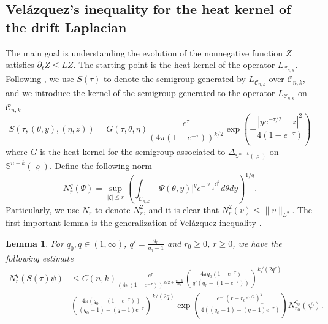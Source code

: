 \documentclass[11pt]{amsart}
\numberwithin{equation}{section}
\newtheorem{lemma}[theorem]{Lemma}
\numberwithin{equation}{section}
\newcommand{\bS}{\mathbb{S}}
\newcommand{\cC}{\mathcal{C}}
\newcommand{\pr}{\partial}
\begin{document}
	\subsection{Vel\'azquez's inequality for the heat kernel of the drift Laplacian}\label{SKZ}
	
	
	The main goal is understanding the evolution of the nonnegative function $Z$ satisfies $\pr_t Z\leq LZ$. The starting point is the heat kernel of the operator $L_{\cC_{n,k}}$. Following \cite{V1}, we use $S(\tau)$ to denote the semigroup generated by $L_{\cC_{n,k}}$ over $\cC_{n,k}$, and we introduce the kernel of the semigroup generated to the operator $L_{\cC_{n,k}}$ on $\cC_{n,k}$
	\begin{equation}\label{EqS}
		S(\tau,(\theta,y),(\eta,z))
		=G(\tau,\theta,\eta)\frac{e^\tau}{(4\pi(1-e^{-\tau}))^{k/2}}
		\exp\left(-\frac{|ye^{-\tau/2}-z|^2}{4(1-e^{-\tau})}\right)
	\end{equation}
	where $G$ is the heat kernel for the semigroup associated to $\Delta_{\bS^{n-k}(\varrho)}$ on $\bS^{n-k}(\varrho)$. Define the following norm
	\begin{equation}
		N_r^q(\Psi)=\sup_{|\xi|\leq r}\left(\int_{\cC_{n,k}}
		|\Psi(\theta,y)|^qe^{-\frac{|y-\xi|^2}{4}}d\theta dy
		\right)^{1/q}.
	\end{equation}
	Particularly, we use $N_r$ to denote $N^2_r$, and it is clear that $N^2_r(v)\leq \|v\|_{L^2}$. The first important lemma is the generalization of Vel\'azquez inequality \cite{V1}.
	
	\begin{lemma}\label{lem:estNr}
		For $q_0,q\in (1,\infty)$, $q'=\frac{q_0}{q_0-1}$ and $r_0\geq 0$, $r\geq 0$, we have the following estimate
		\begin{equation}\label{eq:estNr}
			\begin{aligned}
				N^{q}_{r}(S(\tau)\psi)
				&\leq C(n,k)
				\frac{e^{\tau}}{(4\pi(1-e^{-\tau}))^{k/2+\frac{n-k}{2q_0}}}\left(\frac{4\pi q_0 (1-e^{-\tau})}{q'(q_0-(1-e^{-\tau}))} \right)^{k/(2q')}\\
				&\left(\frac{4\pi(q_0- (1-e^{-\tau}))}{(q_0-1)-(q-1)e^{-\tau} } \right)^{k/(2q)}
				\exp\left(
				\frac{e^{-\tau}(r-r_0e^{\tau/2})_+^2}{4((q_0-1)-(q-1)e^{-\tau})}
				\right)N^{q_0}_{r_0}(\psi).\\
			\end{aligned}
		\end{equation}
	\end{lemma}
	
	
	
\end{document}
